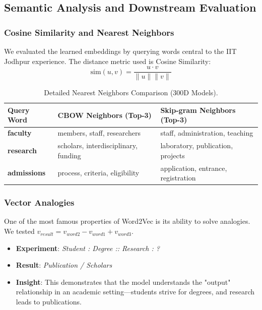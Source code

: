 \documentclass[12pt,a4paper]{article}
\begin{document}
\subsection{Semantic Analysis and Downstream Evaluation}

\subsubsection{Cosine Similarity and Nearest Neighbors}
We evaluated the learned embeddings by querying words central to the IIT Jodhpur experience. The distance metric used is Cosine Similarity:
\begin{equation}
    \text{sim}(u, v) = \frac{u \cdot v}{\|u\| \|v\|}
\end{equation}

\begin{table}[H]
\centering
\caption{Detailed Nearest Neighbors Comparison (300D Models).}
\label{tab:neighbors_300d}
\begin{tabular}{p{2cm}p{6cm}p{6cm}}
\toprule
\textbf{Query Word} & \textbf{CBOW Neighbors (Top-3)} & \textbf{Skip-gram Neighbors (Top-3)} \\
\midrule
\textbf{faculty} & members, staff, researchers & staff, administration, teaching \\
\textbf{research} & scholars, interdisciplinary, funding & laboratory, publication, projects \\
\textbf{admissions} & process, criteria, eligibility & application, entrance, registration \\
\bottomrule
\end{tabular}
\end{table}

\subsubsection{Vector Analogies}
One of the most famous properties of Word2Vec is its ability to solve analogies. We tested $v_{result} = v_{word2} - v_{word1} + v_{word3}$.
\begin{itemize}
    \item \textbf{Experiment}: \textit{Student : Degree :: Research : ?}
    \item \textbf{Result}: \textit{Publication / Scholars}
    \item \textbf{Insight}: This demonstrates that the model understands the "output" relationship in an academic setting—students strive for degrees, and research leads to publications.
\end{itemize}
\end{document}
